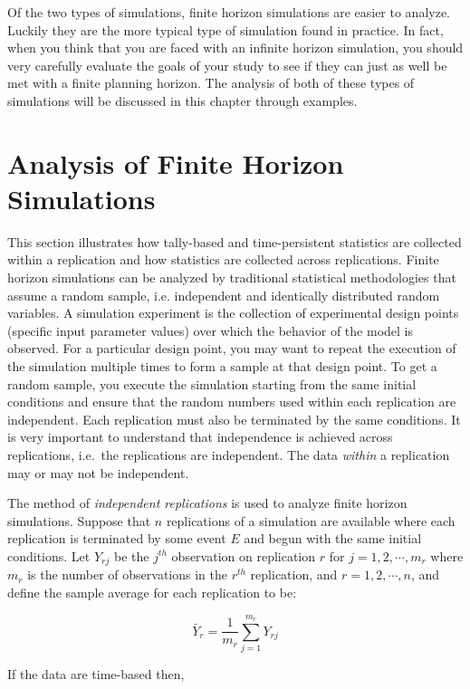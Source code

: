 \documentclass[
]{book}
\theoremstyle{definition}
\theoremstyle{definition}
\theoremstyle{definition}
\theoremstyle{definition}
\theoremstyle{remark}
\begin{document}
Of the two types of simulations, finite horizon simulations are easier
to analyze. Luckily they are the more typical type of simulation found
in practice. In fact, when you think that you are faced with an infinite
horizon simulation, you should very carefully evaluate the goals of your
study to see if they can just as well be met with a finite planning
horizon. The analysis of both of these types of simulations will be
discussed in this chapter through examples.

\hypertarget{simoa:finhorizon}{%
\section{Analysis of Finite Horizon Simulations}\label{simoa:finhorizon}}

This section illustrates how tally-based and time-persistent statistics
are collected within a replication and how statistics are collected
across replications. Finite horizon simulations can be analyzed by
traditional statistical methodologies that assume a random sample, i.e.
independent and identically distributed random variables. A simulation
experiment is the collection of experimental design points (specific
input parameter values) over which the behavior of the model is
observed. For a particular design point, you may want to repeat the
execution of the simulation multiple times to form a sample at that
design point. To get a random sample, you execute the simulation
starting from the same initial conditions and ensure that the random
numbers used within each replication are independent. Each replication
must also be terminated by the same conditions. It is very important to
understand that independence is achieved across replications, i.e.~the
replications are independent. The data \emph{within} a replication may or may
not be independent.

The method of \emph{independent replications} is used to analyze finite
horizon simulations. Suppose that \(n\) replications of a simulation are
available where each replication is terminated by some event \(E\) and
begun with the same initial conditions. Let \(Y_{rj}\) be the \(j^{th}\)
observation on replication \(r\) for \(j = 1,2,\cdots,m_r\) where \(m_r\) is
the number of observations in the \(r^{th}\) replication, and
\(r = 1,2,\cdots,n\), and define the sample average for each replication
to be:

\[\bar{Y}_r = \frac{1}{m_r} \sum_{j=1}^{m_r} Y_{rj}\]

If the data are time-based then,
\end{document}
